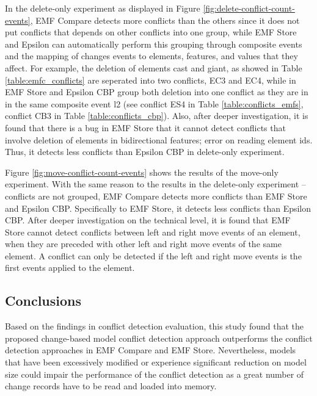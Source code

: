 In the delete-only experiment as displayed in Figure \ref{fig:delete-conflict-count-events}, EMF Compare detects more conflicts than the others since it does not put conflicts that depends on other conflicts into one group, while EMF Store and Epsilon can automatically perform this grouping through composite events and the mapping of changes events to elements, features, and values that they affect. For example, the deletion of elements \textsf{cast} and \textsf{giant}, as showed in Table \ref{table:emfc_conflicts} are seperated into two conflicts, EC3 and EC4, while in EMF Store and Epsilon CBP group both deletion into one conflict as they are in in the same composite event \textsf{l2} (see conflict ES4 in Table \ref{table:conflicts_emfs}, conflict CB3 in Table \ref{table:conflicts_cbp}). Also, after deeper investigation, it is found that there is a bug in EMF Store that it cannot detect conflicts that involve deletion of elements in bidirectional features; error on reading element ids. Thus, it detects less conflicts than Epsilon CBP in delete-only experiment. 

Figure \ref{fig:move-conflict-count-events} shows the results of the move-only experiment. With the same reason to the results in the delete-only experiment -- conflicts are not grouped, EMF Compare detects more conflicts than EMF Store and Epsilon CBP. Specifically to EMF Store, it detects less conflicts than Epsilon CBP. After deeper investigation on the technical level, it is found that EMF Store cannot detect conflicts between left and right move events of an element, when they are preceded with other left and right move events of the same element. A conflict can only be detected if the left and right move events is the first events applied to the element.

\subsection{Conclusions}
\label{sec:conclusions_7}
Based on the findings in conflict detection evaluation, this study found that the proposed change-based model conflict detection approach outperforms the conflict detection approaches in EMF Compare and EMF Store. Nevertheless, models that have been excessively modified or experience significant reduction on model size could impair the performance of the conflict detection as a great number of change records have to be read and loaded into memory. 

